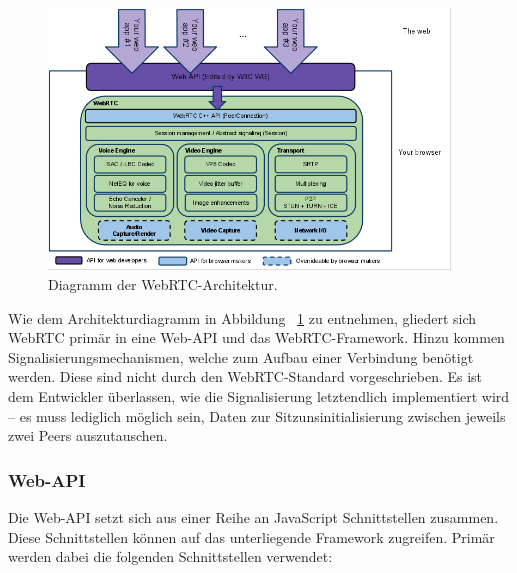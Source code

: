 \begin{figure}[h]
\centering
\includegraphics[width=0.95\textwidth]{bilder/webrtc-diagram.png}
\caption{Diagramm der WebRTC-Architektur.}
\label{fig:webrtcArchitecture}
\end{figure}

Wie dem Architekturdiagramm in Abbildung ~\ref{fig:webrtcArchitecture} zu entnehmen, gliedert sich WebRTC primär in eine Web-\acs{API} und das \acs{WebRTC}-Framework. Hinzu kommen Signalisierungsmechanismen, welche zum Aufbau einer Verbindung benötigt werden. Diese sind nicht durch den WebRTC-Standard vorgeschrieben. Es ist dem Entwickler überlassen, wie die Signalisierung letztendlich implementiert wird -- es muss lediglich möglich sein, Daten zur Sitzunsinitialisierung zwischen jeweils zwei Peers auszutauschen.\par

\subsubsection*{Web-API}
Die Web-\acs{API} setzt sich aus einer Reihe an JavaScript Schnittstellen zusammen. Diese Schnittstellen können auf das unterliegende Framework zugreifen. Primär werden dabei die folgenden Schnittstellen verwendet:

